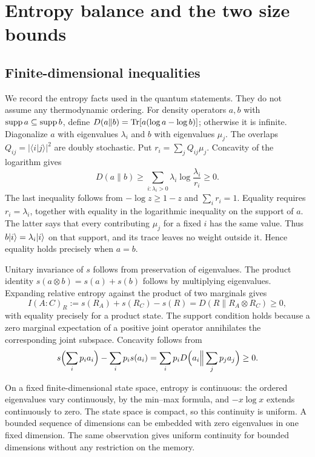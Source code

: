 \section{Entropy balance and the two size bounds}\label{app:entropy}
\subsection{Finite-dimensional inequalities}
We record the entropy facts used in the quantum statements. They do not assume any thermodynamic ordering. For density operators $a,b$ with $\operatorname{supp} a\subseteq\operatorname{supp} b$, define $D(a\|b)=\operatorname{Tr}[a(\log a-\log b)]$; otherwise it is infinite. Diagonalize $a$ with eigenvalues $\lambda_i$ and $b$ with eigenvalues $\mu_j$. The overlaps $Q_{ij}=|\langle i|j\rangle|^2$ are doubly stochastic. Put $r_i=\sum_jQ_{ij}\mu_j$. Concavity of the logarithm gives
\[
 D(a\|b)\ge\sum_{i:\lambda_i>0}\lambda_i\log\frac{\lambda_i}{r_i}\ge0.
\]
The last inequality follows from $-\log z\ge1-z$ and $\sum_i r_i=1$. Equality requires $r_i=\lambda_i$, together with equality in the logarithmic inequality on the support of $a$. The latter says that every contributing $\mu_j$ for a fixed $i$ has the same value. Thus $b\lvert i\rangle=\lambda_i\lvert i\rangle$ on that support, and its trace leaves no weight outside it. Hence equality holds precisely when $a=b$.

Unitary invariance of $s$ follows from preservation of eigenvalues. The product identity $s(a\otimes b)=s(a)+s(b)$ follows by multiplying eigenvalues. Expanding relative entropy against the product of two marginals gives
\begin{equation}
 I(A:C)_R:=s(R_A)+s(R_C)-s(R)=D(R\|R_A\otimes R_C)\ge0, \label{eq:mutualinfo}
\end{equation}
with equality precisely for a product state. The support condition holds because a zero marginal expectation of a positive joint operator annihilates the corresponding joint subspace. Concavity follows from
\[
 s\Bigl(\sum_i p_i a_i\Bigr)-\sum_i p_i s(a_i)
 =\sum_i p_i D\Bigl(a_i\Big\|\sum_jp_j a_j\Bigr)\ge0.
\]

On a fixed finite-dimensional state space, entropy is continuous: the ordered eigenvalues vary continuously, by the min--max formula, and $-x\log x$ extends continuously to zero. The state space is compact, so this continuity is uniform. A bounded sequence of dimensions can be embedded with zero eigenvalues in one fixed dimension. The same observation gives uniform continuity for bounded dimensions without any restriction on the memory.

